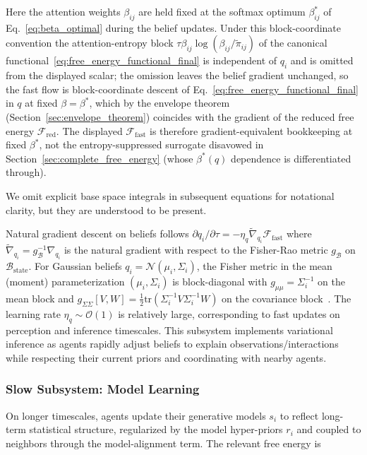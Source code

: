 \documentclass[11pt]{article}
\begin{document}
Here the attention weights $\beta_{ij}$ are held fixed at the softmax optimum $\beta^*_{ij}$ of Eq.~\eqref{eq:beta_optimal} during the belief updates. Under this block-coordinate convention the attention-entropy block $\tau\beta_{ij}\log(\beta_{ij}/\tilde{\pi}_{ij})$ of the canonical functional~\eqref{eq:free_energy_functional_final} is independent of $q_i$ and is omitted from the displayed scalar; the omission leaves the belief gradient unchanged, so the fast flow is block-coordinate descent of Eq.~\eqref{eq:free_energy_functional_final} in $q$ at fixed $\beta = \beta^*$, which by the envelope theorem (Section~\ref{sec:envelope_theorem}) coincides with the gradient of the reduced free energy $\mathcal{F}_{\mathrm{red}}$. The displayed $\mathcal{F}_{\text{fast}}$ is therefore gradient-equivalent bookkeeping at fixed $\beta^*$, not the entropy-suppressed surrogate disavowed in Section~\ref{sec:complete_free_energy} (whose $\beta^*(q)$ dependence is differentiated through).

We omit explicit base space integrals in subsequent equations for notational clarity, but they are understood to be present.

Natural gradient descent on beliefs follows $\partial q_i/\partial \tau = -\eta_q  \tilde{\nabla}_{q_i} \mathcal{F}_{\text{fast}}$ where $\tilde{\nabla}_{q_i} = g_{\mathcal{B}}^{-1} \nabla_{q_i}$ is the natural gradient with respect to the Fisher-Rao metric $g_{\mathcal{B}}$ on $\mathcal{B}_{\mathrm{state}}$. For Gaussian beliefs $q_i = \mathcal{N}(\mu_i, \Sigma_i)$, the Fisher metric in the mean (moment) parameterization $(\mu_i, \Sigma_i)$ is block-diagonal with $g_{\mu\mu} = \Sigma_i^{-1}$ on the mean block and $g_{\Sigma\Sigma}[V, W] = \tfrac{1}{2}\mathrm{tr}(\Sigma_i^{-1} V \Sigma_i^{-1} W)$ on the covariance block~\cite{Amari2016}. The learning rate $\eta_q \sim \mathcal{O}(1)$ is relatively large, corresponding to fast updates on perception and inference timescales. This subsystem implements variational inference as agents rapidly adjust beliefs to explain observations/interactions while respecting their current priors and coordinating with nearby agents.

\subsubsection{Slow Subsystem: Model Learning}

On longer timescales, agents update their generative models $s_i$ to reflect long-term statistical structure, regularized by the model hyper-priors $r_i$ and coupled to neighbors through the model-alignment term. The relevant free energy is
\end{document}
